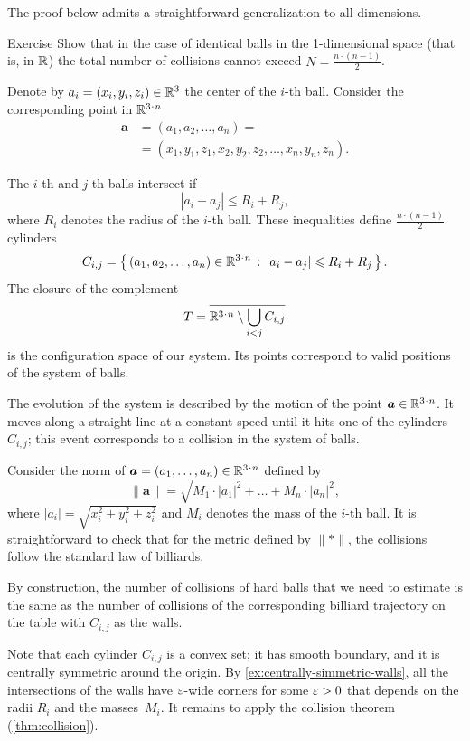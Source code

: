 The proof below admits a straightforward generalization to all dimensions.

\begin{thm}{Exercise}\label{cor:balls:dim=1}
Show that in the case of identical balls in the 1-dimensional space (that is, in $\mathbb{R}$)
the total number of collisions cannot exceed $N=\tfrac{n\cdot(n-1)}2$.
\end{thm}


Denote by $a_i=(x_i,y_i,z_i) \in \mathbb{R}^3$ the center of the $i$-th ball.
Consider the corresponding point in $\RR^{3\cdot n}$
\begin{align*}
\bm{a}&=(a_1, a_2 , \ldots , a_n ) =
\\
&=(x_1, y_1 , z_1 , x_2 , y_2 , z_2 , \ldots , x_n , y_n , z_n).
\end{align*}

The $i$-th and $j$-th balls intersect if 
$$|a_i - a_j | \le R_i+R_j,$$
where $R_i$ denotes the radius of the $i$-th ball.
These inequalities define $\tfrac{n\cdot(n-1)}{2}$ cylinders 
\[C_{i,j}=\set{(a_1, a_2 , \ldots , a_n )\in\RR^{3\cdot n}} {|a_i - a_j |\le R_i+R_j}.\]
The closure of the complement
\[T=\overline{\RR^{3\cdot n}\setminus \bigcup_{i< j} C_{i,j}}\] 
is the configuration space of our system. 
Its points correspond
to valid positions of the system of balls.

The evolution of the system is described by the motion of
the point $\bm{a}\in\RR^{3\cdot n}$.
It moves along a straight line at a
constant speed until it hits one of the cylinders $C_{i,j}$; 
this event corresponds
to a collision in the system of balls.

Consider the norm of $\bm{a}=(a_1,\ldots,a_n)\in \RR^{3\cdot n}$ defined by
\[\lVert \bm{a}\rVert
=
\sqrt{M_1\cdot|a_1|^2+\ldots+M_n\cdot |a_n|^2},\]
where $|a_i|=\sqrt{x_i^2+y_i^2+z_i^2}$ 
and $M_i$ denotes the mass of the $i$-th ball.
It is straightforward to check that for the metric defined by $\lVert {*}\rVert$, the collisions follow the standard law of billiards.

By construction, the number of collisions of hard balls that we need to estimate 
is the same as the number of collisions of the corresponding billiard trajectory on the table with $C_{i,j}$ as the walls.

Note that each cylinder $C_{i,j}$ is a convex set;
it has smooth boundary, 
and it is centrally symmetric around the origin.
By \ref{ex:centrally-simmetric-walls}, all the intersections of the walls have $\varepsilon$-wide corners for some $\varepsilon>0$ that depends on the radii $R_i$ and the masses~$M_i$.
It remains to apply the collision theorem (\ref{thm:collision}).
\qeds

